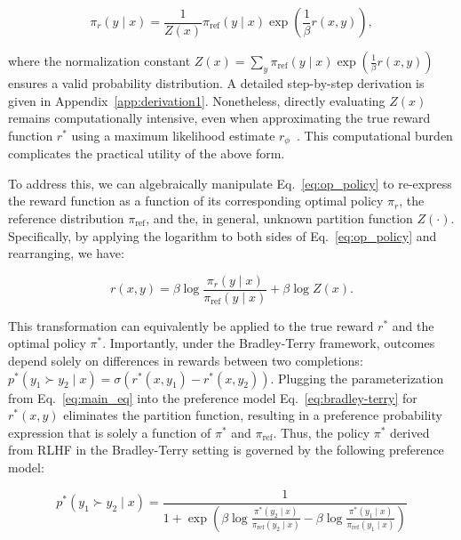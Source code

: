 \begin{equation}\label{eq:op_policy}
    \pi_r(y\mid x) = \frac{1}{Z(x)}\pi_\text{ref}(y\mid x)\exp\left(\frac{1}{\beta}r(x, y)\right),
\end{equation}

where the normalization constant $Z(x) = \sum_{y}\pi_\text{ref}(y\mid x)\exp\left(\frac{1}{\beta}r(x, y)\right)$ ensures a valid probability distribution. A detailed step-by-step derivation is given in Appendix~\ref{app:derivation1}. Nonetheless, directly evaluating $Z(x)$ remains computationally intensive, even when approximating the true reward function $r^*$ using a maximum likelihood estimate $r_\phi$~\citep{korbak2022reinforcement, go2023aligning}. This computational burden complicates the practical utility of the above form. 

To address this, we can algebraically manipulate Eq.~\ref{eq:op_policy} to re-express the reward function as a function of its corresponding optimal policy $\pi_r$, the reference distribution $\pi_\text{ref}$, and the, in general, unknown partition function $Z(\cdot)$. Specifically, by applying the logarithm to both sides of Eq.~\ref{eq:op_policy} and rearranging, we have:

\begin{equation}\label{eq:main_eq}
    r(x,y) =\beta \log \frac{\pi_r(y\mid x)}{\pi_\text{ref}(y\mid x)} + \beta \log Z(x).
\end{equation}

This transformation can equivalently be applied to the true reward $r^*$ and the optimal policy $\pi^*$. Importantly, under the Bradley-Terry framework, outcomes depend solely on differences in rewards between two completions: ${p^*(y_1 \succ y_2 \mid x) = \sigma(r^*(x, y_1) - r^*(x, y_2))}$. Plugging the parameterization from Eq.~\ref{eq:main_eq} into the preference model Eq.~\ref{eq:bradley-terry} for $r^*(x, y)$ eliminates the partition function, resulting in a preference probability expression that is solely a function of $\pi^*$ and $\pi_\text{ref}$. Thus, the policy $\pi^*$ derived from RLHF in the Bradley-Terry setting is governed by the following preference model:

\begin{equation}\label{eq:objective}
    p^*(y_1\succ y_2 \mid x)=\frac{1}{1 + \exp\left(\beta \log \frac{\pi^*(y_2\mid x)}{\pi_\text{ref}(y_2\mid x)} - \beta \log \frac{\pi^*(y_1\mid x)}{\pi_\text{ref}(y_1\mid x)}\right)}
\end{equation}

